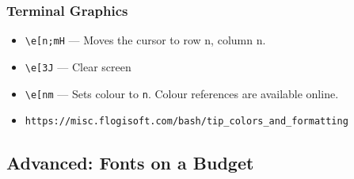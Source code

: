 \documentclass[xcolor]{beamer}
\begin{document}
\begin{frame}
	\frametitle{Terminal Graphics}
	\pause
	
	\begin{itemize}
		\item \texttt{\textbackslash{}e[n;mH} --- Moves the cursor to row n, column n.
		\pause
		
		\item \texttt{\textbackslash{}e[3J} --- Clear screen
		\pause
		
		\item \texttt{\textbackslash{}e[nm} --- Sets colour to \texttt{n}. Colour references are available online.
		\pause
		
		\item \texttt{https://misc.flogisoft.com/bash/tip\_colors\_and\_formatting}
	\end{itemize}
\end{frame}

\subsection{Advanced: Fonts on a Budget}
\end{document}
